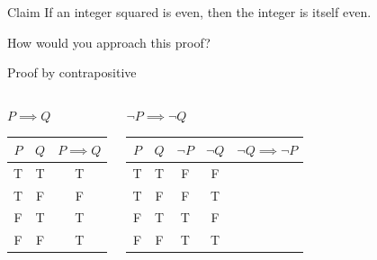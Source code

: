 \documentclass [aspectratio=169]{beamer}
\begin{document}
\begin{frame}{}
\begin{exampleblock}{Claim}
If an integer squared is even, then the integer is itself even.
\end{exampleblock}

\vspace{1em}

How would you approach this proof?

\end{frame}



\begin{frame}{Proof by contrapositive}
    \begin{columns}
        \begin{center}
        $P \implies Q$ \\
        \vspace{1.5em}
\begin{tabular}{|c|c| c|}
\hline
     $P$& $Q$ &  $P \implies Q$ \\ \hline
     T& T & T \\ \hline
     T & F & F \\ \hline
     F & T & T \\ \hline
     F & F & T \\ \hline
\end{tabular}
\end{center}
        \begin{center}
        $\neg P \implies \neg Q$ \\
        \vspace{1.5em}
        \begin{tabular}{|c | c | c |  c | c |}
\hline
     $P$& $Q$ & $\neg P$ &  $\neg Q$ & $\neg Q \implies \neg P$ \\ \hline
     T& T & F & F &  \\ \hline
     T & F & F &  T & \\ \hline
     F & T &  T  & F & \\ \hline
     F & F & T & T &  \\ \hline
\end{tabular}
\end{center}
\end{columns}
\end{frame}
\end{document}
